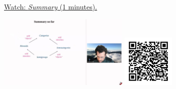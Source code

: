 
\begin{minipage}{10cm}
    \href{https://act4e-spring21.netlify.app/videos/spring2021-semicats-cats:summary.html}{Watch: \emph{Summary} (1 minutes).}
        
    \href{https://act4e-spring21.netlify.app/videos/spring2021-semicats-cats:summary.html}{\includegraphics[height=3.5cm]{spring2021-semicats-cats:summary/thumbnails.jpg}}
    \href{https://act4e-spring21.netlify.app/videos/spring2021-semicats-cats:summary.html}{\includegraphics[height=2.5cm]{spring2021-semicats-cats:summary/qrcode.png}}
\end{minipage}
